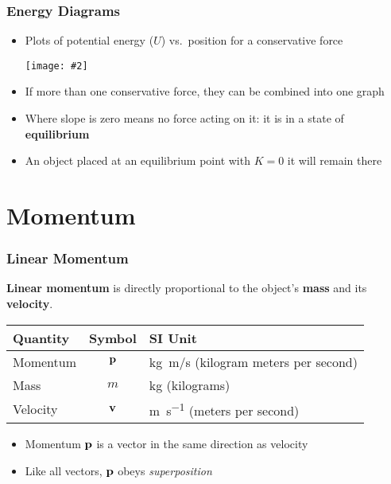 \documentclass[12pt,compress,aspectratio=169]{beamer}
\newcommand{\pic}[2]{\texttt{[image: \#2]}}
\newcommand{\mb}[1]{\ensuremath\mathbf{#1}}
\newcommand{\eq}[2]{\vspace{#1}{\Large\begin{displaymath}#2\end{displaymath}}}
\begin{document}
\begin{frame}
  \frametitle{Energy Diagrams}
  \begin{itemize}
  \item Plots of potential energy ($U$) vs.\ position for a conservative force
    \begin{center}
      \pic{.5}{energy-diagram.png}
    \end{center}
  \item If more than one conservative force, they can be combined into one graph
  \item Where slope is zero means no force acting on it: it is in a state of
    \textbf{equilibrium}
  \item An object placed at an equilibrium point with $K=0$ it will remain there
  \end{itemize}
\end{frame}

\section{Momentum}


\begin{frame}
  \frametitle{Linear Momentum}
  \textbf{Linear momentum} is directly proportional to the object's
  \textbf{mass} and its \textbf{velocity}.

  \eq{-.35in}{
    \boxed{\mb{p}=m\mb{v}}
  }
  \begin{center}
    \begin{tabular}{l|c|l}
      \rowcolor{pink}
      \textbf{Quantity} & \textbf{Symbol} & \textbf{SI Unit} \\ \hline
      Momentum & $\mb{p}$ & \si{\kilo\gram.m/s} (kilogram meters per second) \\
      Mass      & $m$    & \si{\kilo\gram} (kilograms) \\
      Velocity  & $\mb{v}$ & \si{\metre\per\second} (meters per second) \\
    \end{tabular}
  \end{center}
  \begin{itemize}
  \item Momentum $\mb{p}$ is a vector in the same direction as velocity
  \item Like all vectors, $\mb{p}$ obeys \emph{superposition}
  \end{itemize}
\end{frame}
\end{document}
